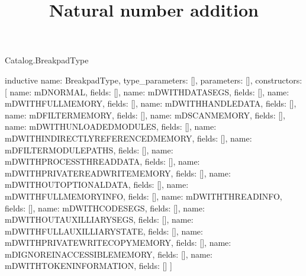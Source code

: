 \begin{lexlean}{Catalog.BreakpadType}
\title{Natural number addition}
\begin{semanticmodule}
inductive{
  name: BreakpadType,
  type_parameters: [],
  parameters: [],
  constructors: [
    {name: mDNORMAL, fields: []},
    {name: mDWITHDATASEGS, fields: []},
    {name: mDWITHFULLMEMORY, fields: []},
    {name: mDWITHHANDLEDATA, fields: []},
    {name: mDFILTERMEMORY, fields: []},
    {name: mDSCANMEMORY, fields: []},
    {name: mDWITHUNLOADEDMODULES, fields: []},
    {name: mDWITHINDIRECTLYREFERENCEDMEMORY, fields: []},
    {name: mDFILTERMODULEPATHS, fields: []},
    {name: mDWITHPROCESSTHREADDATA, fields: []},
    {name: mDWITHPRIVATEREADWRITEMEMORY, fields: []},
    {name: mDWITHOUTOPTIONALDATA, fields: []},
    {name: mDWITHFULLMEMORYINFO, fields: []},
    {name: mDWITHTHREADINFO, fields: []},
    {name: mDWITHCODESEGS, fields: []},
    {name: mDWITHOUTAUXILLIARYSEGS, fields: []},
    {name: mDWITHFULLAUXILLIARYSTATE, fields: []},
    {name: mDWITHPRIVATEWRITECOPYMEMORY, fields: []},
    {name: mDIGNOREINACCESSIBLEMEMORY, fields: []},
    {name: mDWITHTOKENINFORMATION, fields: []}
  ]
}
\end{semanticmodule}
\end{lexlean}
